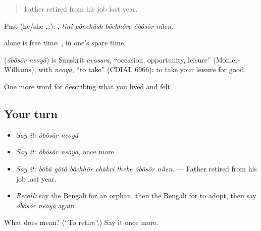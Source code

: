 \begin{quote}
Father retired from his job last year.
\end{quote}

Past (he/she …):     , \emph{tini pônchāsh bôchhôre ôbôsôr nilen}.

 alone is free time: , in one's spare time.

\begin{cousinweb}
\textbf{ } (\emph{ôbôsôr neoyā}) is Sanskrit \emph{avasara}, \textquotedblleft{}occasion, opportunity, leisure\textquotedblright{} (Monier-Williams), with \emph{neoyā}, \textquotedblleft{}to take\textquotedblright{} (CDIAL 6966): to take your leisure for good.
\end{cousinweb}

\begin{grammarlens}[title={What you've built}]
One more word for describing what you lived and felt.
\end{grammarlens}

\subsection*{Your turn}
\begin{itemize}
\raggedright
  \item \emph{Say it:} \emph{ôbôsôr neoyā}
  \item \emph{Say it:} \emph{ôbôsôr neoyā}, once more
  \item \emph{Say it:} \emph{bābā gôtô bôchhôr chākri theke ôbôsôr nilen.} — Father retired from his job last year.
  \item \emph{Recall:} say the Bengali for an orphan, then the Bengali for to adopt, then say \emph{ôbôsôr neoyā} again
\end{itemize}

\begin{tcolorbox}[breakable,colback=teal!4,colframe=teal!35!black,title={Before you move on}]
What does   mean? (\textquotedblleft{}To retire\textquotedblright{}.) Say it once more.
\end{tcolorbox}
